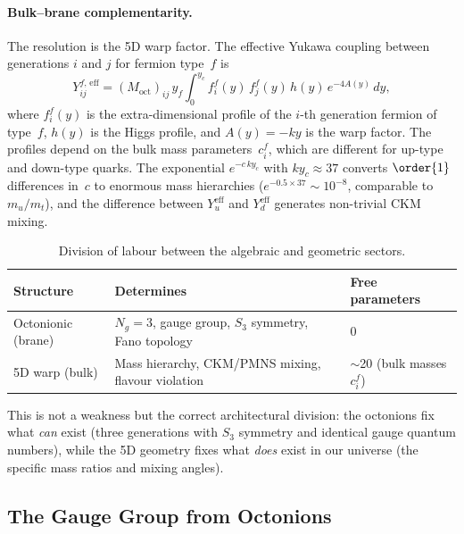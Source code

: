 \paragraph{Bulk--brane complementarity.}
The resolution is the 5D warp factor. The effective Yukawa coupling between generations $i$ and $j$ for fermion type~$f$ is
\begin{equation}
  Y_{ij}^{f,\,\mathrm{eff}} = (M_{\mathrm{oct}})_{ij}\, y_f \int_0^{y_c} f_i^f(y)\, f_j^f(y)\, h(y)\, e^{-4A(y)}\, dy,
  \label{eq:4-90}
\end{equation}
where $f_i^f(y)$ is the extra-dimensional profile of the $i$-th generation fermion of type~$f$, $h(y)$ is the Higgs profile, and $A(y) = -ky$ is the warp factor. The profiles depend on the bulk mass parameters~$c_i^f$, which are different for up-type and down-type quarks. The exponential $e^{-c\, k y_c}$ with $ky_c \approx 37$ converts $\order{1}$ differences in~$c$ to enormous mass hierarchies ($e^{-0.5 \times 37} \sim 10^{-8}$, comparable to $m_u/m_t$), and the difference between $Y_u^{\mathrm{eff}}$ and $Y_d^{\mathrm{eff}}$ generates non-trivial CKM mixing.

\begin{table}[htbp]
\centering
\caption{Division of labour between the algebraic and geometric sectors.}
\label{tab:4-5}
\small
\begin{tabular}{@{}lll@{}}
\toprule
Structure & Determines & Free parameters \\
\midrule
Octonionic (brane) & $N_g = 3$, gauge group, $S_3$ symmetry, Fano topology & 0 \\
5D warp (bulk) & Mass hierarchy, CKM/PMNS mixing, flavour violation & $\sim$20 (bulk masses $c_i^f$) \\
\bottomrule
\end{tabular}
\end{table}

This is not a weakness but the correct architectural division: the octonions fix what \emph{can} exist (three generations with $S_3$ symmetry and identical gauge quantum numbers), while the 5D geometry fixes what \emph{does} exist in our universe (the specific mass ratios and mixing angles).


\subsection{The Gauge Group from Octonions}
\label{sec:4-gauge-oct}

